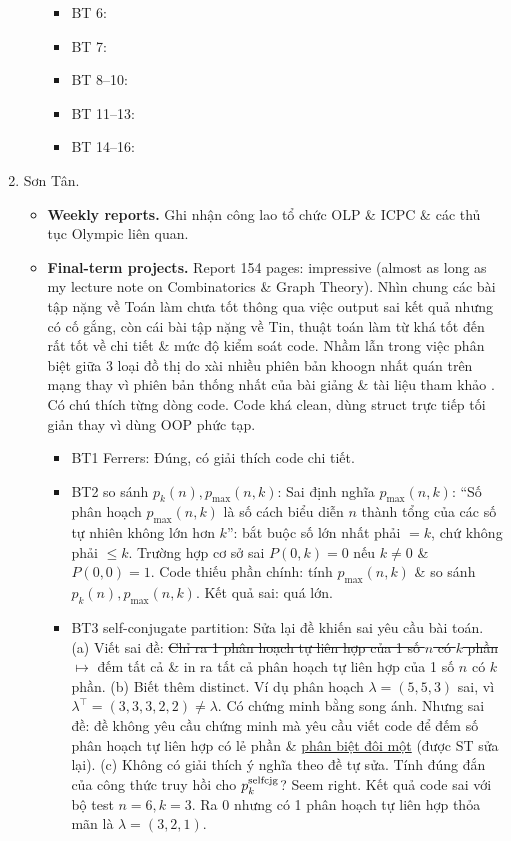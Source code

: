 \documentclass{article}
\begin{document}
\begin{enumerate}
\begin{itemize}
\begin{itemize}
            \item BT 6:
            \item BT 7:
            \item BT 8--10:
            \item BT 11--13:
            \item BT 14--16:
        \end{itemize}
    \end{itemize}
    \item {\sc Sơn Tân.}
    \begin{itemize}
        \item {\bf Weekly reports.} Ghi nhận công lao tổ chức OLP \& ICPC \& các thủ tục Olympic liên quan.
        \item {\bf Final-term projects.} Report 154 pages: impressive (almost as long as my lecture note on Combinatorics \& Graph Theory). Nhìn chung các bài tập nặng về Toán làm chưa tốt thông qua việc output sai kết quả nhưng có cố gắng, còn cái bài tập nặng về Tin, thuật toán làm từ khá tốt đến rất tốt về chi tiết \& mức độ kiểm soát code. Nhầm lẫn trong việc phân biệt giữa 3 loại đồ thị do xài nhiều phiên bản khoogn nhất quán trên mạng thay vì phiên bản thống nhất của bài giảng \& tài liệu tham khảo \cite{Shahriari2022}. Có chú thích từng dòng code. Code khá clean, dùng struct trực tiếp tối giản thay vì dùng OOP phức tạp.
        \begin{itemize}
            \item BT1 Ferrers: Đúng, có giải thích code chi tiết. 
            \item BT2 so sánh $p_k(n),p_{\max}(n,k)$: Sai định nghĩa $p_{\max}(n,k)$: ``Số phân hoạch $p_{\max}(n,k)$ là số cách biểu diễn $n$ thành tổng của các số tự nhiên không lớn hơn $k$'': bắt buộc số lớn nhất phải $= k$, chứ không phải $\le k$. Trường hợp cơ sở sai $P(0,k) = 0$ nếu $k\ne0$ \& $P(0,0) = 1$. Code thiếu phần chính: tính $p_{\max}(n,k)$ \& so sánh $p_k(n),p_{\max}(n,k)$. Kết quả sai: quá lớn.
            \item BT3 self-conjugate partition: Sửa lại đề khiến sai yêu cầu bài toán. (a) Viết sai đề: \st{Chỉ ra 1 phân hoạch tự liên hợp của 1 số $n$ có $k$ phần} $\mapsto$ đếm tất cả \& in ra tất cả phân hoạch tự liên hợp của 1 số $n$ có $k$ phần. (b) Biết thêm distinct. Ví dụ phân hoạch $\lambda = (5,5,3)$ sai, vì $\lambda^\top = (3,3,3,2,2)\ne\lambda$. Có chứng minh bằng song ánh. Nhưng sai đề: đề không yêu cầu chứng minh mà yêu cầu viết code để đếm số phân hoạch tự liên hợp có lẻ phần \& \underline{phân biệt đôi một} (được ST sửa lại). (c) Không có giải thích ý nghĩa theo đề tự sửa. Tính đúng đắn của công thức truy hồi cho $p_k^{\rm selfcjg}$? Seem right. Kết quả code sai với bộ test $n = 6,k = 3$. Ra 0 nhưng có 1 phân hoạch tự liên hợp thỏa mãn là $\lambda = (3,2,1)$.

\end{itemize}
\end{itemize}
\end{enumerate}
\end{document}
